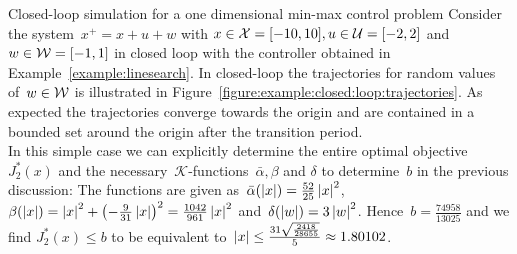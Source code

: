 \begin{example}{Closed-loop simulation for a one dimensional min-max control problem}\label{example:stability:quadratic}
Consider the system~$x^+=x+u+w$ with $x\in\mathcal X=[-10,10],u\in\mathcal U=[-2,2]$ and $w\in\mathcal W=[-1,1]$ in closed loop with the controller obtained in Example~\ref{example:linesearch}.
%
In closed-loop the trajectories for random values of~$w\in\mathcal W$ is illustrated in Figure~\ref{figure:example:closed:loop:trajectories}.
%
As expected the trajectories converge towards the origin and are contained in a bounded set around the origin after the transition period.
%
\\[1em]
%
In this simple case we can explicitly determine the entire optimal objective~$J_2^\ast(x)$ and the necessary~$\mathscr K$-functions~$\bar\alpha,\beta$ and $\delta$ to determine~$b$ in the previous discussion:
%
The functions are given as~$\bar\alpha(\left|x\right|) = \frac{52}{25}\left|x\right|^2$,~$\beta(\left|x\right|) = \left|x\right|^2+\left(-\frac{9}{31}\left|x\right|\right)^2 = \frac{1042}{961}\left|x\right|^2$ and~$\delta(\left|w\right|) = 3\left|w\right|^2$.
%
Hence~$b=\frac{74958}{13025}$ and we find $J_2^\ast(x)\leq b$ to be equivalent to~$\left|x\right|\leq\frac{31 \sqrt{\frac{2418}{28655}}}{5}\approx1.80102$.
%
\begin{figure}\centering
{}
\end{figure}
\end{example}
